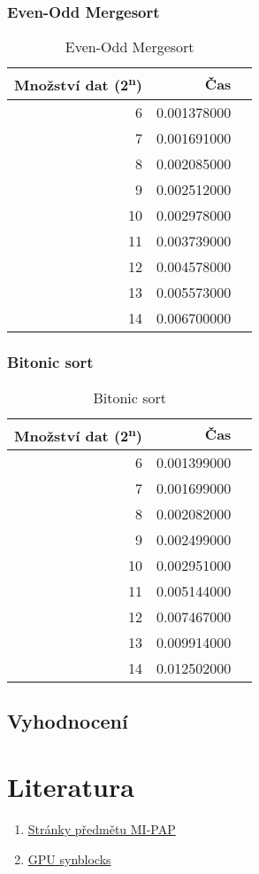 \documentclass[12pt]{article}
\begin{document}
\subsubsection{Even-Odd Mergesort}
\begin{table}[H]
\begin{center}
\begin{tabular}{|r|r|r|}
\hline Množství dat (2\textsuperscript{n}) & Čas \\ \hline
6       &  0.001378000 \\ \hline
7       &  0.001691000 \\ \hline
8       &  0.002085000 \\ \hline
9       &  0.002512000 \\ \hline
10      &  0.002978000 \\ \hline
11      &  0.003739000 \\ \hline
12      &  0.004578000 \\ \hline
13      &  0.005573000 \\ \hline
14      &  0.006700000 \\ \hline
\end{tabular} 
\end{center}
\caption{Even-Odd Mergesort}
\end{table} 

\subsubsection{Bitonic sort}
\begin{table}[H]
\begin{center}
\begin{tabular}{|r|r|r|}
\hline Množství dat (2\textsuperscript{n}) & Čas \\ \hline
6       &  0.001399000 \\ \hline
7       &  0.001699000 \\ \hline
8       &  0.002082000 \\ \hline
9       &  0.002499000 \\ \hline
10      &  0.002951000 \\ \hline
11      &  0.005144000 \\ \hline
12      &  0.007467000 \\ \hline
13      &  0.009914000 \\ \hline
14      &  0.012502000 \\ \hline
\end{tabular} 
\end{center}
\caption{Bitonic sort}
\end{table} 


\subsection{Vyhodnocení}
\section{Literatura}
\begin{enumerate}
\item \href{https://edux.fit.cvut.cz/courses/MI-PAP}{Stránky předmětu MI-PAP}
\item \href{http://aggregate.org/MAGIC/#GPU SyncBlocks}{\label{cud:synblocks}GPU synblocks}
\end{enumerate}
\end{document}
